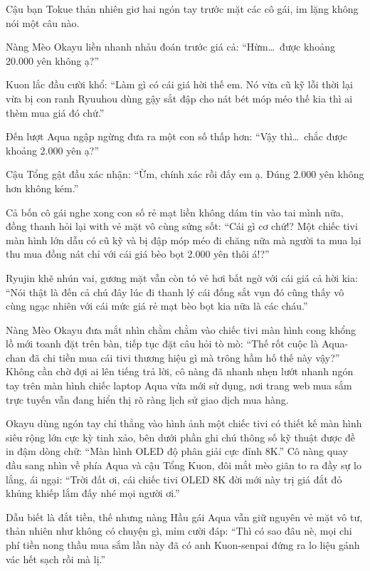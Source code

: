 \documentclass[../main.tex]{subfiles}
\begin{document}
Cậu bạn Tokue thản nhiên giơ hai ngón tay trước mặt các cô gái, im lặng không nói một câu nào.

Nàng Mèo Okayu liền nhanh nhảu đoán trước giá cả: ``Hừm\dots\ được khoảng 20.000 yên không ạ?''

Kuon lắc đầu cười khổ: ``Làm gì có cái giá hời thế em. Nó vừa cũ kỹ lỗi thời lại vừa bị con ranh Ryuuhou dùng gậy sắt đập cho nát bét móp méo thế kia thì ai thèm mua giá đó chứ.''

Đến lượt Aqua ngập ngừng đưa ra một con số thấp hơn: ``Vậy thì\dots\ chắc được khoảng 2.000 yên ạ?''

Cậu Tổng gật đầu xác nhận: ``Ừm, chính xác rồi đấy em ạ. Đúng 2.000 yên không hơn không kém.''

Cả bốn cô gái nghe xong con số rẻ mạt liền không dám tin vào tai mình nữa, đồng thanh hỏi lại with vẻ mặt vô cùng sửng sốt: ``Cái gì cơ chứ!? Một chiếc tivi màn hình lớn dẫu có cũ kỹ và bị đập móp méo đi chăng nữa mà người ta mua lại thu mua đồng nát chỉ với cái giá bèo bọt 2.000 yên thôi á!?''

Ryujin khẽ nhún vai, gương mặt vẫn còn tỏ vẻ hơi bất ngờ với cái giá cả hời kia: ``Nói thật là đến cả chú đây lúc đi thanh lý cái đống sắt vụn đó cũng thấy vô cùng ngạc nhiên với cái mức giá rẻ mạt bèo bọt kia nữa là các cháu.''

Nàng Mèo Okayu đưa mắt nhìn chằm chằm vào chiếc tivi màn hình cong khổng lồ mới toanh đặt trên bàn, tiếp tục đặt câu hỏi tò mò: ``Thế rốt cuộc là Aqua-chan đã chi tiền mua cái tivi thương hiệu gì mà trông hầm hố thế này vậy?'' Không cần chờ đợi ai lên tiếng trả lời, cô nàng đã nhanh nhẹn lướt nhanh ngón tay trên màn hình chiếc laptop Aqua vừa mới sử dụng, nơi trang web mua sắm trực tuyến vẫn đang hiển thị rõ ràng lịch sử giao dịch mua hàng.


Okayu dùng ngón tay chỉ thẳng vào hình ảnh một chiếc tivi có thiết kế màn hình siêu rộng lớn cực kỳ tinh xảo, bên dưới phần ghi chú thông số kỹ thuật được đề in đậm dòng chữ: ``Màn hình OLED độ phân giải cực đỉnh 8K.'' Cô nàng quay đầu sang nhìn về phía Aqua và cậu Tổng Kuon, đôi mắt mèo giãn to ra đầy sự lo lắng, ái ngại: ``Trời đất ơi, cái chiếc tivi OLED 8K đời mới này trị giá đắt đỏ khủng khiếp lắm đấy nhé mọi người ơi.''

Dẫu biết là đắt tiền, thế nhưng nàng Hầu gái Aqua vẫn giữ nguyên vẻ mặt vô tư, thản nhiên như không có chuyện gì, mỉm cười đáp: ``Thì có sao đâu nè, mọi chi phí tiền nong thầu mua sắm lần này đã có anh Kuon-senpai đứng ra lo liệu gánh vác hết sạch rồi mà lị.''
\end{document}
